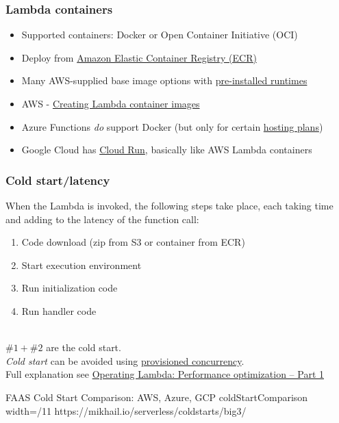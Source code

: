 \documentclass[11pt,aspectratio=169]{beamer}
\begin{document}
\begin{nrcanFrame}
  \frametitle{Lambda containers}
  \begin{itemize}
  \item Supported containers: Docker or Open Container Initiative (OCI)
  \item Deploy from \href{https://aws.amazon.com/ecr/}{Amazon Elastic Container Registry (ECR)}
  \item Many AWS-supplied base image options with \href{https://docs.aws.amazon.com/lambda/latest/dg/lambda-runtimes.html}{pre-installed runtimes}
  \item
    AWS - \href{https://docs.aws.amazon.com/lambda/latest/dg/images-create.html}{Creating
      Lambda container images}
    \item Azure Functions \textit{do} support Docker (but only for certain
    \href{https://docs.microsoft.com/en-us/azure/azure-functions/functions-scale}{hosting
      plans})
    \item Google Cloud has \href{https://cloud.google.com/run}{Cloud
      Run}, basically like AWS Lambda containers
  \end{itemize}
\end{nrcanFrame}


\begin{nrcanFrame}
  \frametitle{Cold start/latency}
  When the Lambda is invoked, the following steps take place, each taking time and adding to the latency of the function call:
  \begin{enumerate}
  \item Code download (zip from S3 or container from ECR)
  \item Start execution environment
  \item Run initialization code
  \item Run handler code
  \end{enumerate}

  \ \\
  $\#1 + \#2$ are the \alert{cold start}.\\
  \textit{Cold start} can be avoided using \href{https://docs.aws.amazon.com/lambda/latest/dg/provisioned-concurrency.html}{provisioned concurrency}.\\
  Full explanation see \href{https://aws.amazon.com/blogs/compute/operating-lambda-performance-optimization-part-1/}{Operating Lambda: Performance optimization – Part 1}
\end{nrcanFrame}

\nrcanGraphicFrame
  {FAAS Cold Start Comparison: AWS, Azure, GCP}
  {coldStartComparison}
  {width=/11}
  {https://mikhail.io/serverless/coldstarts/big3/}
\end{document}
